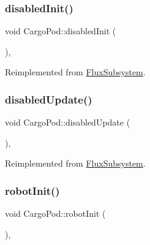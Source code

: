 \mbox{\label{classCargoPod_a924ef514ed33ea4e7f7ef966f5b83fa7}} 
\subsubsection{\texorpdfstring{disabled\+Init()}{disabledInit()}}
{\footnotesize\ttfamily void Cargo\+Pod\+::disabled\+Init (\begin{DoxyParamCaption}{ }\end{DoxyParamCaption})\hspace{0.3cm}{\ttfamily [override]}, {\ttfamily [virtual]}}



Reimplemented from \hyperlink{classFluxSubsystem_aa0b8fde8aa5094627d15d24e545e1da4}{Flux\+Subsystem}.

\mbox{\label{classCargoPod_a71b58a975ba9f20f4a9023aa3fcbba0e}} 
\subsubsection{\texorpdfstring{disabled\+Update()}{disabledUpdate()}}
{\footnotesize\ttfamily void Cargo\+Pod\+::disabled\+Update (\begin{DoxyParamCaption}{ }\end{DoxyParamCaption})\hspace{0.3cm}{\ttfamily [override]}, {\ttfamily [virtual]}}



Reimplemented from \hyperlink{classFluxSubsystem_a5c39cb0f0834cc77a2b8f4f47778da87}{Flux\+Subsystem}.

\mbox{\label{classCargoPod_a28aaa86f3e7ee713748f4e9b1a136fd8}} 
\subsubsection{\texorpdfstring{robot\+Init()}{robotInit()}}
{\footnotesize\ttfamily void Cargo\+Pod\+::robot\+Init (\begin{DoxyParamCaption}{ }\end{DoxyParamCaption})\hspace{0.3cm}{\ttfamily [override]}, {\ttfamily [virtual]}}



